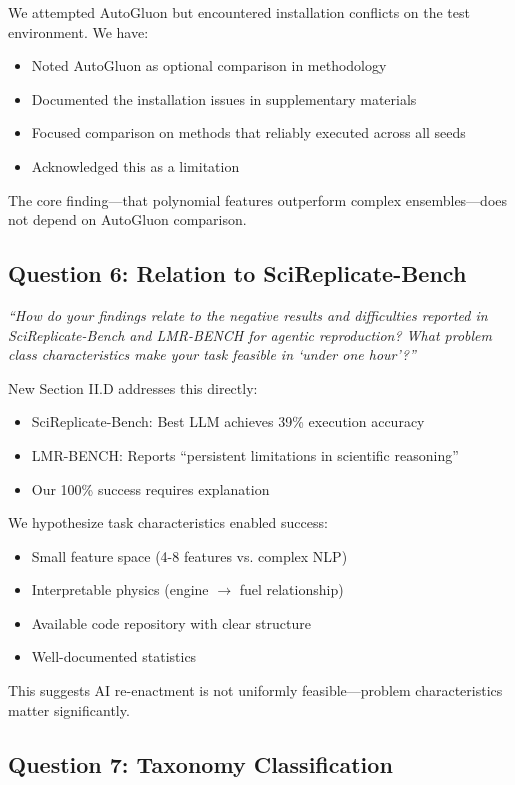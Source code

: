 \documentclass[11pt]{article}
\newcommand{\reviewer}[1]{\textcolor{reviewercolor}{\textit{#1}}}
\newcommand{\response}[1]{\textcolor{responsecolor}{#1}}
\begin{document}
\response{We attempted AutoGluon but encountered installation conflicts on the test environment. We have:
\begin{itemize}
    \item Noted AutoGluon as optional comparison in methodology
    \item Documented the installation issues in supplementary materials
    \item Focused comparison on methods that reliably executed across all seeds
    \item Acknowledged this as a limitation
\end{itemize}
The core finding---that polynomial features outperform complex ensembles---does not depend on AutoGluon comparison.
}

\subsection*{Question 6: Relation to SciReplicate-Bench}

\reviewer{``How do your findings relate to the negative results and difficulties reported in SciReplicate-Bench and LMR-BENCH for agentic reproduction? What problem class characteristics make your task feasible in `under one hour'?''}

\response{New Section II.D addresses this directly:
\begin{itemize}
    \item SciReplicate-Bench: Best LLM achieves 39\% execution accuracy
    \item LMR-BENCH: Reports ``persistent limitations in scientific reasoning''
    \item Our 100\% success requires explanation
\end{itemize}
We hypothesize task characteristics enabled success:
\begin{itemize}
    \item Small feature space (4-8 features vs. complex NLP)
    \item Interpretable physics (engine $\rightarrow$ fuel relationship)
    \item Available code repository with clear structure
    \item Well-documented statistics
\end{itemize}
This suggests AI re-enactment is not uniformly feasible---problem characteristics matter significantly.
}

\subsection*{Question 7: Taxonomy Classification}
\end{document}
